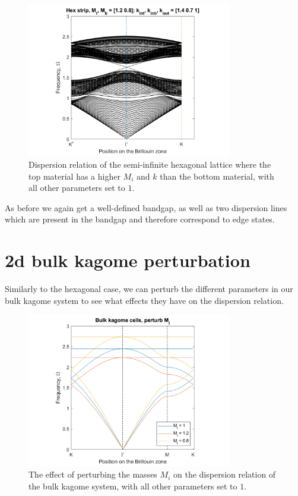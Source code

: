 \begin{figure}[!h]
\centering
\includegraphics[width=0.8\textwidth]{imgs/hexstripperturb2.png}
\caption{\label{fig:hexstrip2} Dispersion relation of the semi-infinite
  hexagonal lattice where the top material has a higher $M_i$ and $k$ than the
  bottom material, with all other parameters set to $1$.}
\end{figure}

As before we again get a well-defined bandgap, as well as two dispersion lines
which are present in the bandgap and therefore correspond to edge states.

\section{2d bulk kagome perturbation}
\label{kagomeperturb}

Similarly to the hexagonal case, we can perturb the different parameters in our
bulk kagome system to see what effects they have on the dispersion relation.

\begin{figure}[!h]
\centering
\includegraphics[width=0.8\textwidth]{imgs/kagomeperturbM.png}
\caption{\label{fig:kagomeM} The effect of perturbing the masses $M_i$ on the
  dispersion relation of the bulk kagome system, with all other parameters set
  to $1$.}
\end{figure}

